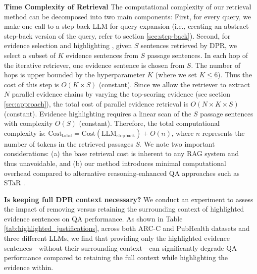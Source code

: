 \textbf{Time Complexity of Retrieval}
The computational complexity of our retrieval method can be decomposed into two main components: First, for every query, we make one call to a step-back LLM for query expansion (i.e., creating an abstract step-back version of the query, refer to section \ref{sec:step-back}). Second, for evidence selection and highlighting \cite{yadav2020unsupervisedalignmentbasediterativeevidence}, given $S$ sentences retrieved by DPR, we select a subset of $K$ evidence sentences  from $S$ passage sentences. In each hop of the iterative retriever, one evidence sentence is chosen from $S$. The number of hops is upper bounded by the hyperparameter $K$ (where we set $K \leq 6$). 
Thus the cost of this step is $O(K \times S)$ (constant). Since we allow the retriever to extract $N$ parallel evidence chains by varying the top-scoring evidence (see section \ref{sec:approach}), the total cost of parallel evidence retrieval is $O(N \times K \times S)$ (constant). Evidence highlighting requires a linear scan of the $S$ passage sentences with complexity $O(S)$ (constant). Therefore, the total computational complexity is: $\text{Cost}_{\text{total}} = \text{Cost}({\text{LLM}_{\text{stepback}}}) + O(n)$, where $n$ represents the number of tokens in the retrieved passages $S$. We note two important considerations: (a) the base retrieval cost is inherent to any RAG system and thus unavoidable, and (b) our method introduces minimal computational overhead compared to alternative reasoning-enhanced QA approaches such as STaR \cite{zelikman2022starbootstrappingreasoningreasoning}.

\textbf{Is keeping full DPR context necessary?}
We conduct an experiment to assess the impact of removing versus retaining the surrounding context of highlighted evidence sentences on QA performance. As shown in Table \ref{tab:highlighted_justifications}, across both ARC-C and PubHealth datasets and three different LLMs, we find that providing only the highlighted evidence sentences—without their surrounding context—can significantly degrade QA performance compared to retaining the full context while highlighting the evidence within.

